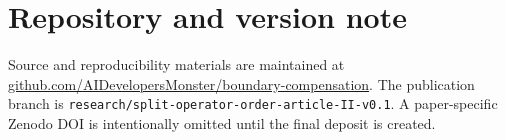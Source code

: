 \documentclass[11pt]{article}
\theoremstyle{definition}
\theoremstyle{remark}
\begin{document}
\section*{Repository and version note}
Source and reproducibility materials are maintained at
\href{https://github.com/AIDevelopersMonster/boundary-compensation}{github.com/AIDevelopersMonster/boundary-compensation}.
The publication branch is \texttt{research/split-operator-order-article-II-v0.1}. A paper-specific Zenodo DOI is intentionally omitted until the final deposit is created.
\end{document}
